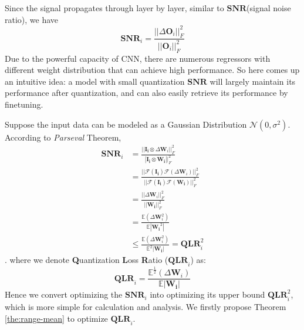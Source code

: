 \documentclass[letterpaper]{article} %
\begin{document}
Since the signal propagates through layer by layer, similar to $\mathbf{SNR}$(signal noise ratio), 
we have 
\begin{equation}
\mathbf{SNR}_i=\frac{||\Delta \mathbf{O}_{i}||_F^2}{||\mathbf{O}_i||_F^2}
\end{equation}
Due to the powerful capacity of CNN, there are numerous regressors with different weight distribution that can achieve high performance. So here comes up an intuitive idea:
a model with small quantization $\mathbf{SNR}$ will largely maintain its performance after quantization, and can also easily retrieve its performance by finetuning.

Suppose the input data can be modeled as a Gaussian Distribution $\mathcal N(0, \sigma^2)$. According to \emph{Parseval} Theorem, 
\begin{equation}
    \begin{aligned}	
    \mathbf{SNR}_i
	& = \frac{||\mathbf{I_i} \otimes \Delta \mathbf{W}_{i}||_F^2}{|\mathbf{I_i} \otimes {\mathbf{W_i}}||_F^2} \\
    & = \frac{||\mathcal{F}(\mathbf{I_i})\mathcal{F}(\Delta \mathbf{W}_{i})||_F^2}{||\mathcal{F} (\mathbf{I_i})\mathcal{F}({\mathbf{W_i}})||_F^2} \\
    & = \frac{||\Delta \mathbf{W}_{i}||_F^2}{||\mathbf{W_i}||_F^2} \\
    & = \frac{\mathbb{E}(\Delta \mathbf{W}^2_{i})}{\mathbb{E}|\mathbf{W_i}^2|} \\
    & \le \frac{\mathbb{E}(\Delta \mathbf{W}^2_{i})}{\mathbb{E}^2|\mathbf{W_i}|} = \mathbf{QLR}_i^2
    \end{aligned}
\end{equation}.
where we denote \textbf{Q}uantization \textbf{L}oss \textbf{R}atio ($\mathbf{QLR}_{i}$) as:
\begin{equation}
\mathbf{QLR}_{i}=\frac{\mathbb{E}^{\frac{1}{2}}(\Delta \mathbf{W}_{i})}{\mathbb{E}|\mathbf{W_i}|} 
\end{equation}
Hence we convert optimizing the $\mathbf{SNR}_i$ into optimizing its upper bound $\mathbf{QLR}_{i}^{2}$, which is more simple for calculation and analysis. We firstly propose Theorem \ref{the:range-mean} to optimize $\mathbf{QLR}_{i}$.
\end{document}
